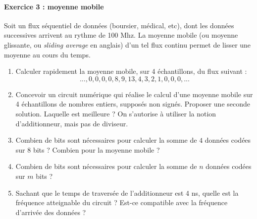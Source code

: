 \documentclass[a4paper,11pt]{article}
\begin{document}
\paragraph{Exercice 3 : moyenne mobile} Soit un flux séquentiel de données (boursier, médical, etc), dont les données successives arrivent au rythme de 100 Mhz.
La moyenne mobile (ou moyenne glissante, ou {\it sliding average} en anglais) d'un tel flux continu permet de lisser une moyenne au cours du temps.
\begin{enumerate}
  \item Calculer rapidement la moyenne mobile, sur 4 échantillons, du flux suivant : $$...,0,0,0,0,8,9,13,4,3,2,1,0,0,0,...$$
  \item Concevoir un circuit numérique qui réalise le calcul d'une moyenne mobile sur 4 échantillons de nombres entiers, supposés non signés. Proposer une seconde solution. Laquelle est meilleure ?
  On s'autorise à utiliser la notion d'additionneur, mais pas de diviseur.
  \item Combien de bits sont nécessaires pour calculer la somme de $4$ données codées sur $8$ bits ?  Combien pour la moyenne mobile ?
  \item Combien de bits sont nécessaires pour calculer la somme de $n$ données codées sur $m$ bits ?
  \item Sachant que le temps de traversée de l'additionneur est 4 ns, quelle est la fréquence atteignable du circuit ? Est-ce compatible avec la fréquence d'arrivée des données ?
\end{enumerate}
\end{document}
